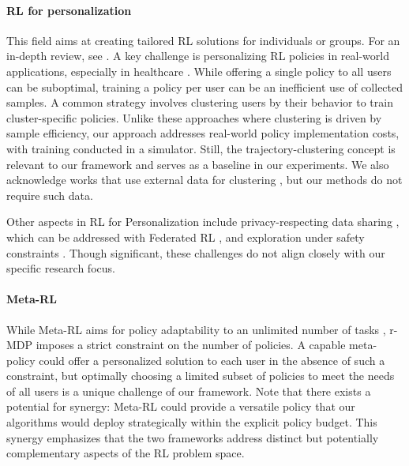 \documentclass[letterpaper]{article} %
\begin{document}
\paragraph{RL for personalization}

This field aims at creating tailored RL solutions for individuals or groups. For an in-depth review, see \cite{den2020reinforcement}. A key challenge is personalizing RL policies in real-world applications, especially in healthcare \cite{hassouni2018personalization,zhu2018group,grua2018exploring,el2019end,el2022ph}. While offering a single policy to all users can be suboptimal, training a policy per user can be an inefficient use of collected samples. A common strategy involves clustering users by their behavior to train cluster-specific policies. Unlike these approaches where clustering is driven by sample efficiency, our approach addresses real-world policy implementation costs, with training conducted in a simulator. Still, the trajectory-clustering concept is relevant to our framework and serves as a baseline in our experiments. We also acknowledge works that use external data for clustering \cite{martin2004agentx,goindani2020cluster}, but our methods do not require such data.


Other aspects in RL for Personalization include privacy-respecting data sharing \cite{tabatabaei2018narrowing,baucum2022adapting}, which can be addressed with Federated RL \cite{nadiger2019federated}, and exploration under safety constraints \cite{perkins2002lyapunov,hans2008safe,moldovan2012safe,junges2016safety}. Though significant, these challenges do not align closely with our specific research focus.

\paragraph{Meta-RL}

While Meta-RL aims for policy adaptability to an unlimited number of tasks \cite{finn2017model}, r-MDP imposes a strict constraint on the number of policies. A capable meta-policy could offer a personalized solution to each user in the absence of such a constraint, but optimally choosing a limited subset of policies to meet the needs of all users is a unique challenge of our framework. Note that there exists a potential for synergy: Meta-RL could provide a versatile policy that our algorithms would deploy strategically within the explicit policy budget. This synergy emphasizes that the two frameworks address distinct but potentially complementary aspects of the RL problem space.
\end{document}

